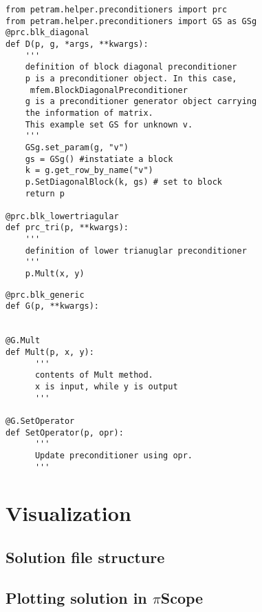 \documentclass[11pt,a4paper,draft]{report}
\begin{document}
\begin{minipage}[c]{0.95\textwidth}
\begin{lstlisting}[frame=single, caption={A user defined diag/lowertriangular preconditioner},captionpos=b, label={prc2}]
from petram.helper.preconditioners import prc
from petram.helper.preconditioners import GS as GSg
@prc.blk_diagonal
def D(p, g, *args, **kwargs):
    '''
    definition of block diagonal preconditioner
    p is a preconditioner object. In this case,
     mfem.BlockDiagonalPreconditioner
    g is a preconditioner generator object carrying 
    the information of matrix.
    This example set GS for unknown v.  
    '''
    GSg.set_param(g, "v")
    gs = GSg() #instatiate a block
    k = g.get_row_by_name("v")
    p.SetDiagonalBlock(k, gs) # set to block
    return p
    
@prc.blk_lowertriagular
def prc_tri(p, **kwargs):
    '''
    definition of lower trianuglar preconditioner
    '''
    p.Mult(x, y)
\end{lstlisting}
\end{minipage}

\begin{minipage}[c]{0.95\textwidth}
\begin{lstlisting}[caption={A user defined generic preconditioner},captionpos=b, frame=single, label={prc3}]
@prc.blk_generic
def G(p, **kwargs):


@G.Mult
def Mult(p, x, y):
      '''
      contents of Mult method. 
      x is input, while y is output
      '''

@G.SetOperator
def SetOperator(p, opr):
      '''
      Update preconditioner using opr.
      '''
\end{lstlisting}
 \end{minipage}

\chapter{Visualization}
\section{Solution file structure}
\section{Plotting solution in $\pi$Scope}
\end{document}
